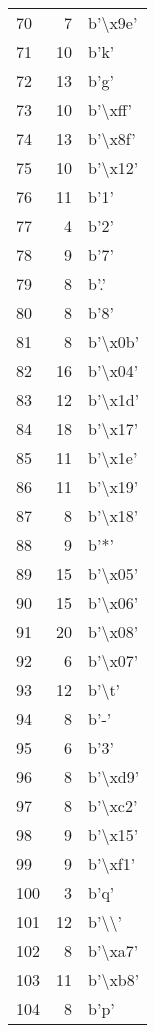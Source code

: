 \begin{tabular}{lrl}
70  &    7 &  b'\textbackslash x9e' \\
71  &   10 &     b'k' \\
72  &   13 &     b'g' \\
73  &   10 &  b'\textbackslash xff' \\
74  &   13 &  b'\textbackslash x8f' \\
75  &   10 &  b'\textbackslash x12' \\
76  &   11 &     b'1' \\
77  &    4 &     b'2' \\
78  &    9 &     b'7' \\
79  &    8 &     b'.' \\
80  &    8 &     b'8' \\
81  &    8 &  b'\textbackslash x0b' \\
82  &   16 &  b'\textbackslash x04' \\
83  &   12 &  b'\textbackslash x1d' \\
84  &   18 &  b'\textbackslash x17' \\
85  &   11 &  b'\textbackslash x1e' \\
86  &   11 &  b'\textbackslash x19' \\
87  &    8 &  b'\textbackslash x18' \\
88  &    9 &     b'*' \\
89  &   15 &  b'\textbackslash x05' \\
90  &   15 &  b'\textbackslash x06' \\
91  &   20 &  b'\textbackslash x08' \\
92  &    6 &  b'\textbackslash x07' \\
93  &   12 &    b'\textbackslash t' \\
94  &    8 &     b'-' \\
95  &    6 &     b'3' \\
96  &    8 &  b'\textbackslash xd9' \\
97  &    8 &  b'\textbackslash xc2' \\
98  &    9 &  b'\textbackslash x15' \\
99  &    9 &  b'\textbackslash xf1' \\
100 &    3 &     b'q' \\
101 &   12 &    b'\textbackslash \textbackslash ' \\
102 &    8 &  b'\textbackslash xa7' \\
103 &   11 &  b'\textbackslash xb8' \\
104 &    8 &     b'p' \\

\end{tabular}
